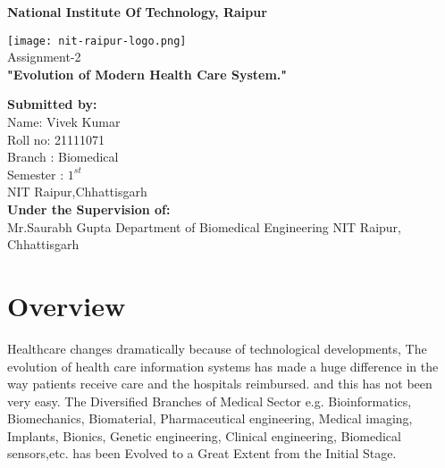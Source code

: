 \documentclass[12pt]{article}
\begin{document}
\pagestyle{empty}



   \begin{center}
       \vspace{1cm}
	   \Large
       \textbf{National Institute Of Technology, Raipur } 
       \vspace{1.5cm}
     
       \texttt{[image: nit-raipur-logo.png]}\\
       \vspace{0.8cm}
       \Huge
       Assignment-2\\
       \vspace{0.8cm}
      \textbf{ "Evolution of Modern Health Care System."}
      
	\vfill      
      
   \begin{multicols}{2} 
   \begin{flushleft}
       \large
       \textbf{Submitted by:}\\
       Name: Vivek Kumar\\
       Roll no: 21111071\\
       Branch : Biomedical\\
       Semester : $1^{st}$ \\
       NIT Raipur,Chhattisgarh\\
       \columnbreak
       \textbf{Under the Supervision of:}\\
       Mr.Saurabh Gupta
       Department of Biomedical Engineering
       NIT Raipur, Chhattisgarh
    \end{flushleft}
    \end{multicols}    
            
   \end{center}

\clearpage
\pagestyle{fancy}
\tableofcontents
\clearpage

\section{Overview}

Healthcare changes dramatically because of technological developments, The evolution of health care information systems has made a huge difference in the way patients receive care and the hospitals reimbursed. and this has not been very easy. The Diversified Branches of Medical Sector e.g. Bioinformatics, Biomechanics, Biomaterial, Pharmaceutical engineering, Medical imaging, Implants, Bionics, Genetic engineering, Clinical engineering, Biomedical sensors,etc. has been Evolved to a Great Extent from the Initial Stage.
\end{document}
